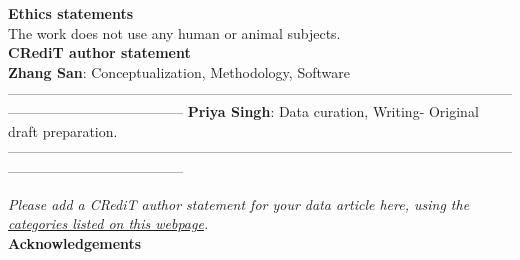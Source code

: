 \documentclass[11pt, letterpaper]{article}
\begin{document}

\section*{}
\noindent
\textbf{Ethics statements}\\

\noindent
The work does not use any human or animal subjects.\\

\noindent
\textbf{CRediT author statement}\\

\noindent
\textbf{Zhang San}: Conceptualization, Methodology, Software \\
--------------------------------------------------------------------------------------------------------------------------------------------------
\textbf{Priya Singh}: Data curation, Writing- Original draft preparation. \\
--------------------------------------------------------------------------------------------------------------------------------------------------

\noindent
{\it Please add a CRediT author statement for your data article here, using the \href{https://www.elsevier.com/authors/journal-authors/policies-and-ethics/credit-author-statement}{categories listed on this webpage}.}\\


\noindent
\textbf{Acknowledgements}\\
\end{document}
